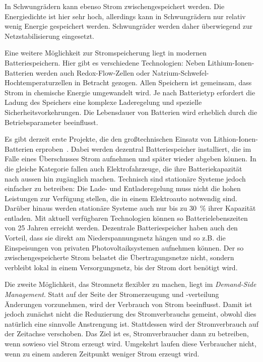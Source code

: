 \documentclass[logo]{fhgart}
\begin{document}
In Schwungrädern kann ebenso Strom zwischengespeichert werden. Die
Energiedichte ist hier sehr hoch, allerdings kann in Schwungrädern nur
relativ wenig Energie gespeichert werden. Schwungräder werden daher
überwiegend zur Netzstabilisierung eingesetzt.

Eine weitere Möglichkeit zur Stromspeicherung liegt in modernen
Batteriespeichern. Hier gibt es verschiedene Technologien: Neben
Lithium-Ionen-Batterien werden auch Redox-Flow-Zellen oder
Natrium-Schwefel-Hochtemperaturzellen in Betracht gezogen. Allen
Speichern ist gemeinsam, dass Strom in chemische Energie umgewandelt
wird. Je nach Batterietyp erfordert die Ladung des Speichers eine
komplexe Laderegelung und spezielle Sicherheitsvorkehrungen. Die
Lebensdauer von Batterien wird erheblich durch die Betriebsparameter
beeinflusst.

Es gibt derzeit erste Projekte, die den
großtechnischen Einsatz von Lithion-Ionen-Batterien
erproben~\cite{braun09lithium}. Dabei werden dezentral Batteriespeicher
installiert, die im Falle eines Überschusses Strom aufnehmen und später
wieder abgeben können. In die gleiche Kategorie fallen auch
Elektrofahrzeuge, die ihre Batteriekapazität nach aussen hin zugänglich
machen. Technisch sind stationäre Systeme jedoch einfacher zu betreiben:
Die Lade- und Entladeregelung muss nicht die hohen Leistungen zur
Verfügung stellen, die in einem Elektroauto notwendig sind. Darüber
hinaus werden stationäre Systeme auch nur bis zu 30~\% ihrer Kapazität
entladen. Mit aktuell verfügbaren Technologien können so
Batterielebenszeiten von 25 Jahren erreicht werden. Dezentrale
Batteriespeicher haben auch den Vorteil, dass sie direkt am
Niederspannungsnetz hängen und so z.B. die Einspeisungen von privaten
Photovoltaiksystemen aufnehmen können. Der so zwischengespeicherte Strom
belastet die Übertragungsnetze nicht, sondern verbleibt lokal in einem
Versorgungsnetz, bis der Strom dort benötigt wird.

Die zweite Möglichkeit, das Stromnetz flexibler zu machen, liegt im \emph{Demand-Side
Management}. Statt auf der Seite der Stromerzeugung und -verteilung
Änderungen vorzunehmen, wird der Verbrauch von Strom beeinflusst. Damit
ist jedoch zunächst nicht die Reduzierung des Stromverbrauchs gemeint,
obwohl dies natürlich eine sinnvolle Anstrengung ist. Stattdessen wird
der Stromverbrauch auf der Zeitachse verschoben. Das Ziel ist es,
Stromverbraucher dann zu betreiben, wenn sowieso viel Strom erzeugt
wird. Umgekehrt laufen diese Verbraucher nicht, wenn zu einem anderen
Zeitpunkt weniger Strom erzeugt wird.
\end{document}
